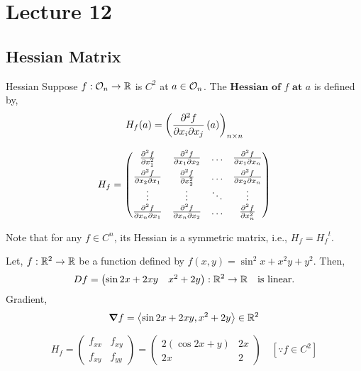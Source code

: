 \documentclass[../Analysis-3.tex]{subfiles}
\begin{document}
\chapter*{Lecture 12} %
\setcounter{chapter}{12} %
\setcounter{section}{0}

\section{Hessian Matrix}

\begin{Def}{Hessian}{}
  Suppose $f : \mathcal{O}_{n} \to \mathbb{R}$ is $C^2$ at $a \in \mathcal{O}_{n} $. The $\textbf{Hessian of $f$ at $a$}$ is defined by, \[ H_f(a) = \left( \pdv{f}{x_i}{x_j}\left( a \right) \right)_{n \times n} \]
\end{Def}

\[ H_{f} = \begin{pmatrix}
    \pdv[2]{f}{x_1}   & \pdv{f}{x_1}{x_2} & \ldots & \pdv{f}{x_1}{x_n} \\[5pt]
    \pdv{f}{x_2}{x_1} & \pdv[2]{f}{x_2}   & \ldots & \pdv{f}{x_2}{x_n} \\
    \vdots            & \vdots            & \ddots & \vdots            \\
    \pdv{f}{x_n}{x_1} & \pdv{f}{x_n}{x_2} & \ldots & \pdv[2]{f}{x_n}
  \end{pmatrix} \]

Note that for any $ f \in C^n $, its Hessian is a symmetric matrix, i.e., $H_f = {H_f}^t$.

\begin{Eg}{}{}
  Let, $f : \mathbb{R}^2 \to \mathbb{R}$ be a function defined by $f(x,y) = \sin^2 x + x^2y + y^2$. Then,
  \[Df = \begin{pmatrix}
      \sin2x + 2xy & x^2 + 2y
    \end{pmatrix} :  \mathbb{R}^2 \to \mathbb{R} \quad \text{is linear.} \]
  Gradient, \[\grad f = \left\langle \sin2x + 2xy, x^2 + 2y \right\rangle \in \mathbb{R}^2 \]

  \[ H_f = \begin{pmatrix}
      f_{xx} & f_{xy} \\
      f_{xy} & f_{yy}
    \end{pmatrix} = \begin{pmatrix}
      2( \cos2x + y) & 2x \\
      2x             & 2
    \end{pmatrix} \quad [ \because  f \in C^2] \]

\end{Eg}
\end{document}
